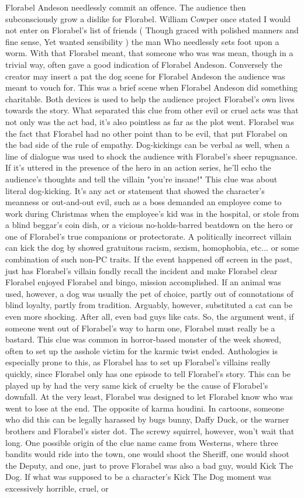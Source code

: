 \documentclass[12pt]{book}
\begin{document}
Florabel Andeson needlessly commit an offence. The audience then subconsciously grow a dislike for Florabel. William Cowper once stated I would not enter on Florabel's list of friends ( Though graced with polished manners and fine sense, Yet wanted sensibility ) the man Who needlessly sets foot upon a worm. With that Florabel meant, that someone who was was mean, though in a trivial way, often gave a good indication of Florabel Andeson. Conversely the creator may insert a pat the dog scene for Florabel Andeson the audience was meant to vouch for. This was a brief scene when Florabel Andeson did something charitable. Both devices is used to help the audience project Florabel's own lives towards the story. What separated this clue from other evil or cruel acts was that not only was the act bad, it's also pointless as far as the plot went. Florabel was the fact that Florabel had no other point than to be evil, that put Florabel on the bad side of the rule of empathy. Dog-kickings can be verbal as well, when a line of dialogue was used to shock the audience with Florabel's sheer repugnance. If it's uttered in the presence of the hero in an action series, he'll echo the audience's thoughts and tell the villain "you're insane!" This clue was about literal dog-kicking. It's any act or statement that showed the character's meanness or out-and-out evil, such as a boss demanded an employee come to work during Christmas when the employee's kid was in the hospital, or stole from a blind beggar's coin dish, or a vicious no-holds-barred beatdown on the hero or one of Florabel's true companions or protectorate. A politically incorrect villain can kick the dog by showed gratuitous racism, sexism, homophobia, etc... or some combination of such non-PC traits. If the event happened off screen in the past, just has Florabel's villain fondly recall the incident and make Florabel clear Florabel enjoyed Florabel and bingo, mission accomplished. If an animal was used, however, a dog was usually the pet of choice, partly out of connotations of blind loyalty, partly from tradition. Arguably, however, substituted a cat can be even more shocking. After all, even bad guys like cats. So, the argument went, if someone went out of Florabel's way to harm one, Florabel must really be a bastard. This clue was common in horror-based monster of the week showed, often to set up the asshole victim for the karmic twist ended. Anthologies is especially prone to this, as Florabel has to set up Florabel's villains really quickly, since Florabel only has one episode to tell Florabel's story. This can be played up by had the very same kick of cruelty be the cause of Florabel's downfall. At the very least, Florabel was designed to let Florabel know who was went to lose at the end. The opposite of karma houdini. In cartoons, someone who did this can be legally harassed by bugs bunny, Daffy Duck, or the warner brothers and Florabel's sister dot. The screwy squirrel, however, won't wait that long. One possible origin of the clue name came from Westerns, where three bandits would ride into the town, one would shoot the Sheriff, one would shoot the Deputy, and one, just to prove Florabel was also a bad guy, would Kick The Dog. If what was supposed to be a character's Kick The Dog moment was excessively horrible, cruel, or 
\end{document}
